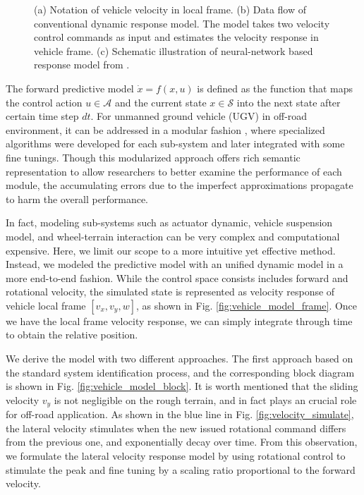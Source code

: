\documentclass[../thesis.tex]{subfiles}
\begin{document}
\begin{figure}[t]
\begin{subfigure}[b]{0.8\linewidth}
		\subcaption{}
		\label{fig:vehicle_model_net}
	\end{subfigure}
	\caption{(a) Notation of vehicle velocity in local frame. (b) Data flow of conventional dynamic response model. The model takes two velocity control commands as input and estimates the velocity response in vehicle frame. (c) Schematic illustration of neural-network based response model from \cite{bode2007learning}.}
    \label{fig:vehicle_model}
\end{figure}


The forward predictive model $\dot{x}=f(x,u)$ is defined as the function that maps the control action $u \in \mathcal{A}$ and the current state $x \in \mathcal{S}$ into the next state after certain time step $dt$. For unmanned ground vehicle (UGV) in off-road environment, it can be addressed in a modular fashion \cite{kelly2007terrain,howard2006trajectory,howard2005terrain}, where specialized algorithms were developed for each sub-system and later integrated with some fine tunings. Though this modularized approach offers rich semantic representation to allow researchers to better examine the performance of each module, the accumulating errors due to the imperfect approximations propagate to harm the overall performance. 

In fact, modeling sub-systems such as actuator dynamic, vehicle suspension model, and wheel-terrain interaction can be very complex and computational expensive. Here, we limit our scope to a more intuitive yet effective method. Instead, we modeled the predictive model with an unified dynamic model in a more end-to-end fashion. While the control space consists includes forward and rotational velocity, the simulated state is represented as velocity response of vehicle local frame $[v_x, v_y, w]$, as shown in Fig. \ref{fig:vehicle_model_frame}. Once we have the local frame velocity response, we can simply integrate through time to obtain the relative position. 

We derive the model with two different approaches. The first approach based on the standard system identification process, and the corresponding block diagram is shown in Fig. \ref{fig:vehicle_model_block}. It is worth mentioned that the sliding velocity $v_y$ is not negligible on the rough terrain, and in fact plays an crucial role for off-road application. As shown in the blue line in Fig. \ref{fig:velocity_simulate}, the lateral velocity stimulates when the new issued rotational command differs from the previous one, and exponentially decay over time. From this observation, we formulate the lateral velocity response model by using rotational control to stimulate the peak and fine tuning by a scaling ratio proportional to the forward velocity.
\end{document}
